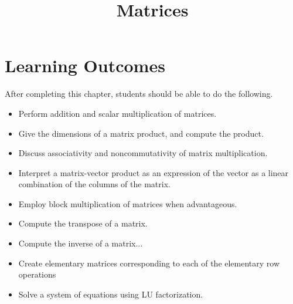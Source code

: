 \documentclass{ximera}
\title{Matrices}
\begin{document}
\begin{abstract}

\end{abstract}
 
\maketitle
 
\section*{Learning Outcomes}
After completing this chapter, students should be able to do the following.
 
\begin{itemize}
    \item Perform addition and scalar multiplication of matrices.
    \item Give the dimensions of a matrix product, and compute the product.
    \item Discuss associativity and noncommutativity of matrix multiplication.
    \item  Interpret a matrix-vector product as an expression of the vector as a linear combination of the columns of the matrix.
    \item Employ block multiplication of matrices when advantageous.
    \item Compute the transpose of a matrix.    \item Compute the inverse of a matrix...
    \item Create elementary matrices corresponding to each of the elementary row operations    
    \item Solve a system of equations using LU factorization.

 
\end{itemize}

 
\end{document}

